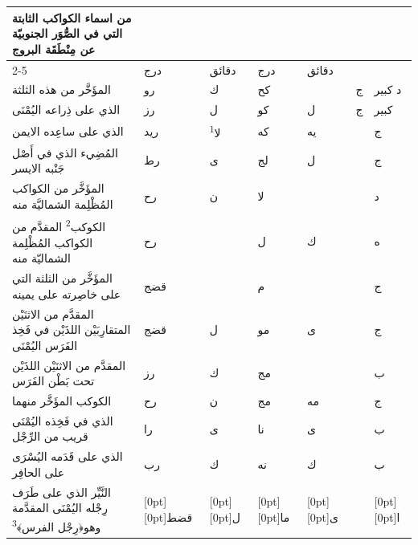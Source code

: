 \documentclass[11pt]{article}
\newcommand{\AbjadZero}{{\NallinoSigns\symbol{"E000}}}
\begin{document}
\begin{Arabic}\begin{tabular}{|p{84mm}|>{\centering\arraybackslash}p{9mm}|>{\centering\arraybackslash}p{9mm}|>{\centering\arraybackslash}p{9mm}|>{\centering\arraybackslash}p{9mm}|>{\centering\arraybackslash}p{14mm}|>{\centering\arraybackslash}p{17mm}|}\hline
\multirow{2}{*}{\parbox{80mm}{\centering من اسماء الكواكب الثابتة التي في الصُّوَر الجنوبيّة عن مِنْطَقَة البروج}} & \multicolumn{2}{c|}{الطول} & \multicolumn{2}{c|}{العرض} & \multirow{2}{*}{\parbox{13mm}{\centering\small علامات الجهة}} & \multirow{2}{*}{\parbox{16mm}{\centering\small مراتب العظمة}} \\ \cline{2-5}
 & {\small درج} & {\small دقائق} & {\small درج} & {\small دقائق} & & \\ \hline
المؤَخَّر من هذه الثلثة & رو & ك & كح & \AbjadZero{} & ج & د كبير \\
الذي على ذِراعه اليُمْنَى & رز & ل & كو & ل & ج & كبير \\
الذي على ساعِده الايمن & ريد & لا\textsuperscript{1} & كه & يه &  & ج \\
المُضِيء الذي في أَصْل جَنْبه الايسر & رط & ى & لج & ل &  & ج \\
المؤَخَّر من الكواكب المُظْلِمة الشماليَّة منه & رح & ن & لا & \AbjadZero{} &  & د \\
الكوكب\textsuperscript{2} المقدَّم من الكواكب المُظْلِمة الشماليّة منه & رح & \AbjadZero{} & ل & ك &  & ه \\
المؤَخَّر من الثلثة التي على خاصِرته على يمينه & قضج & \AbjadZero{} & م & \AbjadZero{} &  & ج \\
المقدَّم من الاثنَيْن المتقارِبَيْن اللذَيْن في فَخِذ الفَرَس اليُمْنَى & قضج & ل & مو & ى &  & ج \\
المقدَّم من الاثنَيْن اللذَيْن تحت بَطْن الفَرَس & رز & ك & مج & \AbjadZero{} &  & ب \\
الكوكب المؤَخَّر منهما & رح & ن & مج & مه &  & ج \\
الذي في فَخِذه اليُمْنَى قريب من الرِّجْل & را & ى & نا & ى &  & ب \\
الذي على قَدَمه اليُسْرَى على الحافِر & رب & ك & نه & ك &  & ب \\
النَّيِّر الذي على طَرَف رِجْله اليُمْنَى المقدَّمة وهو\newline ﴿رِجْل الفرس﴾\textsuperscript{3} & \raisebox{-1\normalbaselineskip}[0pt][0pt]{قضط} & \raisebox{-1\normalbaselineskip}[0pt][0pt]{ل} & \raisebox{-1\normalbaselineskip}[0pt][0pt]{ما} & \raisebox{-1\normalbaselineskip}[0pt][0pt]{ى} &  & \raisebox{-1\normalbaselineskip}[0pt][0pt]{ا} \\

\end{tabular}
\end{Arabic}
\end{document}
